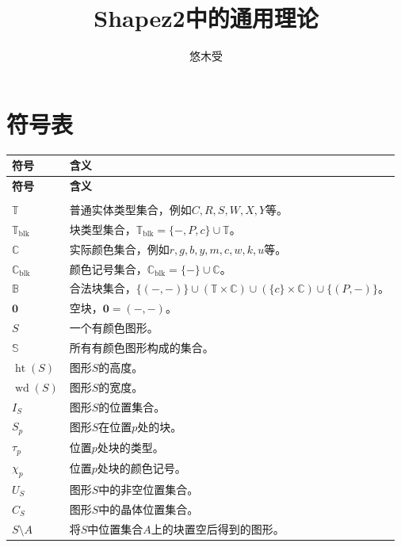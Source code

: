\documentclass[UTF8,fontset=none]{ctexart}
\title{Shapez2中的通用理论}
\author{悠木受}
\theoremstyle{cnthm}
\begin{document}
	
	\maketitle
	
	\begin{abstract}
		
		
		
	\end{abstract}
	
	\tableofcontents
	
	\section*{符号表}
	
	\begin{longtable}{>{\raggedright\arraybackslash}p{}
			>{\raggedright\arraybackslash}p{}}
		\textbf{符号} & \textbf{含义}\\
		\hline
		\endfirsthead
		
		\textbf{符号} & \textbf{含义}\\
		\hline
		\endhead
		
		\multicolumn{2}{l}{\textbf{块与图形}}\\
		\hline
		$\mathbb{T}$ & 普通实体类型集合，例如$C,R,S,W,X,Y$等。\\
		$\mathbb{T}_{\mathrm{blk}}$ & 块类型集合，$\mathbb{T}_{\mathrm{blk}}=\{-,P,c\}\cup\mathbb{T}$。\\
		$\mathbb{C}$ & 实际颜色集合，例如$r,g,b,y,m,c,w,k,u$等。\\
		$\mathbb{C}_{\mathrm{blk}}$ & 颜色记号集合，$\mathbb{C}_{\mathrm{blk}}=\{-\}\cup\mathbb{C}$。\\
		$\mathbb{B}$ & 合法块集合，$\{(-,-)\}\cup(\mathbb{T}\times\mathbb{C})\cup(\{c\}\times\mathbb{C})\cup\{(P,-)\}$。\\
		$\mathbf{0}$ & 空块，$\mathbf{0}=(-,-)$。\\
		$S$ & 一个有颜色图形。\\
		$\mathbb{S}$ & 所有有颜色图形构成的集合。\\
		$\operatorname{ht}(S)$ & 图形$S$的高度。\\
		$\operatorname{wd}(S)$ & 图形$S$的宽度。\\
		$I_S$ & 图形$S$的位置集合。\\
		$S_p$ & 图形$S$在位置$p$处的块。\\
		$\tau_p$ & 位置$p$处块的类型。\\
		$\chi_p$ & 位置$p$处块的颜色记号。\\
		$U_S$ & 图形$S$中的非空位置集合。\\
		$C_S$ & 图形$S$中的晶体位置集合。\\
		$S\setminus A$ & 将$S$中位置集合$A$上的块置空后得到的图形。\\
		

\end{longtable}
\end{document}
